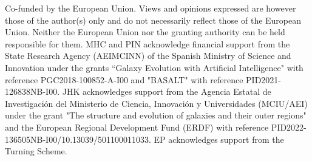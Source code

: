 \documentclass{aa}
\begin{document}






\begin{acknowledgements}

Co-funded by the European Union. Views and opinions expressed are however those of the author(s) only and do not necessarily reflect those of the European Union. Neither the European Union nor the granting authority can be held responsible for them. MHC and PIN acknowledge financial support from the State Research Agency (AEI\-MCINN) of the Spanish Ministry of Science and Innovation under the grants ``Galaxy Evolution with Artificial Intelligence" with reference PGC2018-100852-A-I00 and "BASALT" with reference PID2021-126838NB-I00. JHK acknowledges support from the Agencia Estatal de Investigaci\'on del Ministerio de Ciencia, Innovaci\'on y Universidades (MCIU/AEI) under the grant "The structure and evolution of galaxies and their outer regions" and the European Regional Development Fund (ERDF) with reference PID2022-136505NB-I00/10.13039/501100011033. EP acknowledges support from the Turning Scheme. 



\end{acknowledgements}




%
%

%
\end{document}
